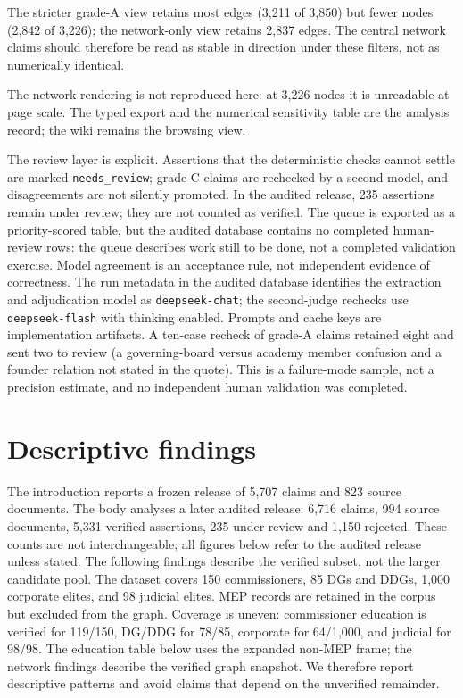 \documentclass[11pt,a4paper]{article}
\begin{document}
The stricter grade-A view retains most edges (3,211 of 3,850) but fewer nodes (2,842 of 3,226); the network-only view retains 2,837 edges. The central network claims should therefore be read as stable in direction under these filters, not as numerically identical.


The network rendering is not reproduced here: at 3,226 nodes it is unreadable at page scale. The typed export and the numerical sensitivity table are the analysis record; the wiki remains the browsing view.

The review layer is explicit. Assertions that the deterministic checks cannot settle are marked \texttt{needs\_review}; grade-C claims are rechecked by a second model, and disagreements are not silently promoted. In the audited release, 235 assertions remain under review; they are not counted as verified. The queue is exported as a priority-scored table, but the audited database contains no completed human-review rows: the queue describes work still to be done, not a completed validation exercise. Model agreement is an acceptance rule, not independent evidence of correctness. The run metadata in the audited database identifies the extraction and adjudication model as \texttt{deepseek-chat}; the second-judge rechecks use \texttt{deepseek-flash} with thinking enabled. Prompts and cache keys are implementation artifacts. A ten-case recheck of grade-A claims retained eight and sent two to review (a governing-board versus academy member confusion and a founder relation not stated in the quote). This is a failure-mode sample, not a precision estimate, and no independent human validation was completed.

\section{Descriptive findings}

The introduction reports a frozen release of 5,707 claims and 823 source documents. The body analyses a later audited release: 6,716 claims, 994 source documents, 5,331 verified assertions, 235 under review and 1,150 rejected. These counts are not interchangeable; all figures below refer to the audited release unless stated. The following findings describe the verified subset, not the larger candidate pool. The dataset covers 150 commissioners, 85 DGs and DDGs, 1{,}000 corporate elites, and 98 judicial elites. MEP records are retained in the corpus but excluded from the graph. Coverage is uneven: commissioner education is verified for 119/150, DG/DDG for 78/85, corporate for 64/1{,}000, and judicial for 98/98. The education table below uses the expanded non-MEP frame; the network findings describe the verified graph snapshot. We therefore report descriptive patterns and avoid claims that depend on the unverified remainder.
\end{document}
